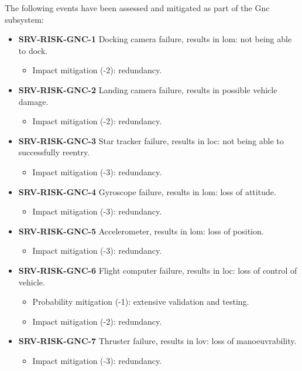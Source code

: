\noindent The following events have been assessed and mitigated as part of the Gnc subsystem:

\begin{itemize}
	 \item \textbf{SRV-RISK-GNC-1} Docking camera failure, results in lom: not being able to dock.
	\begin{itemize}
		 \item Impact mitigation (-2):  redundancy.	\end{itemize}
	 \item \textbf{SRV-RISK-GNC-2} Landing camera failure, results in possible vehicle damage.
	\begin{itemize}
		 \item Impact mitigation (-2):  redundancy.	\end{itemize}
	 \item \textbf{SRV-RISK-GNC-3} Star tracker failure, results in loc: not being able to successfully reentry.
	\begin{itemize}
		 \item Impact mitigation (-3):  redundancy.	\end{itemize}
	 \item \textbf{SRV-RISK-GNC-4} Gyroscope failure, results in lom: loss of attitude.
	\begin{itemize}
		 \item Impact mitigation (-3):  redundancy.	\end{itemize}
	 \item \textbf{SRV-RISK-GNC-5} Accelerometer, results in lom: loss of position.
	\begin{itemize}
		 \item Impact mitigation (-3):  redundancy.	\end{itemize}
	 \item \textbf{SRV-RISK-GNC-6} Flight computer failure, results in loc: loss of control of vehicle.
	\begin{itemize}
		 \item Probability mitigation (-1):  extensive validation and testing.		 \item Impact mitigation (-2):  redundancy.	\end{itemize}
	 \item \textbf{SRV-RISK-GNC-7} Thruster failure, results in lov: loss of manoeuvrability.
	\begin{itemize}
		 \item Impact mitigation (-3):  redundancy.	\end{itemize}

\end{itemize}
